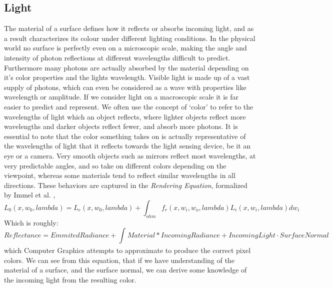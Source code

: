 \documentclass[ %
                    author={Gavin Parker},
                supervisor={Dr. Neill Campbell},
                    degree={MEng},
                     title={Deep Learning for Illumination Estimation from Stereo Images},
                  subtitle={},
                      type={Research},
                      year={2018} ]{dissertation}
\begin{document}
\subsection{Light}
The material of a surface defines how it reflects or absorbs incoming light, and as a result characterizes its colour under different lighting conditions. In the physical world no surface is perfectly even on a microscopic scale, making the angle and intensity of photon reflections at different wavelengths difficult to predict. Furthermore many photons are actually absorbed by the material depending on it's color properties and the lights wavelength. Visible light is made up of a vast supply of photons, which can even be considered as a wave with properties like wavelength or amplitude. If we consider light on a macroscopic scale it is far easier to predict and represent. We often use the concept of `color' to refer to the wavelengths of light which an object reflects, where lighter objects reflect more wavelengths and darker objects reflect fewer, and absorb more photons. It is essential to note that the color something takes on is actually representative of the wavelengths of light that it reflects towards the light sensing device, be it an eye or a camera. Very smooth objects such	 as mirrors reflect most wavelengths, at very predictable angles, and so take on different colors depending on the viewpoint, whereas some materials tend to reflect similar wavelengths in all directions. These behaviors are captured in the \textit{Rendering Equation}, formalized by Immel et al. \cite{Immel:1986:RMN:15886.15901},
\[L_0(x, w_0, lambda) = L_e(x, w_0, lambda) + \int_{ohm}{f_r(x, w_i, w_o,lambda)L_i(x, w_i, lambda)dw_i}\]
Which is roughly:
\[Reflectance = Emmited Radiance +  \int_{}{Material * Incoming Radiance + Incoming Light \cdot Surface Normal}\]
which Computer Graphics attempts to approximate to produce the correct pixel colors. We can see from this equation, that if we have understanding of the material of a surface, and the surface normal, we can derive some knowledge of the incoming light from the resulting color.
\end{document}

